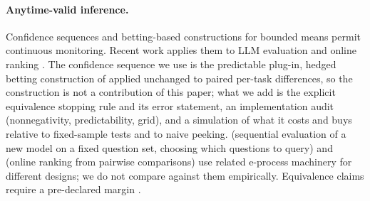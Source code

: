 \paragraph{Anytime-valid inference.} Confidence sequences \citep{howard2021cs} and betting-based constructions for bounded means \citep{waudbysmith2024betting,ramdas2023gametheoretic} permit continuous monitoring. Recent work applies them to LLM evaluation and online ranking \citep{hsu2026sequential,gu2026serpant}. The confidence sequence we use is the predictable plug-in, hedged betting construction of \citet{waudbysmith2024betting} applied unchanged to paired per-task differences, so the construction is not a contribution of this paper; what we add is the explicit equivalence stopping rule and its error statement, an implementation audit (nonnegativity, predictability, grid), and a simulation of what it costs and buys relative to fixed-sample tests and to naive peeking. \citet{hsu2026sequential} (sequential evaluation of a new model on a fixed question set, choosing which questions to query) and \citet{gu2026serpant} (online ranking from pairwise comparisons) use related e-process machinery for different designs; we do not compare against them empirically. Equivalence claims require a pre-declared margin \citep{lakens2017equivalence}.
